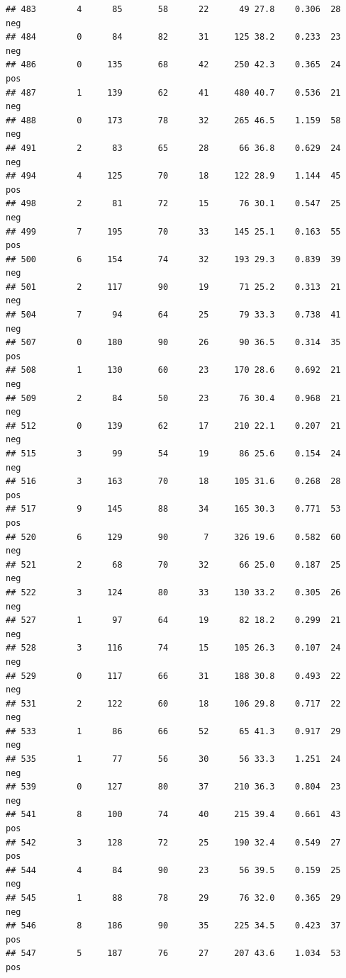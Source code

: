 \documentclass[
]{article}
\begin{document}
\begin{verbatim}
## 483        4      85       58      22      49 27.8    0.306  28      neg
## 484        0      84       82      31     125 38.2    0.233  23      neg
## 486        0     135       68      42     250 42.3    0.365  24      pos
## 487        1     139       62      41     480 40.7    0.536  21      neg
## 488        0     173       78      32     265 46.5    1.159  58      neg
## 491        2      83       65      28      66 36.8    0.629  24      neg
## 494        4     125       70      18     122 28.9    1.144  45      pos
## 498        2      81       72      15      76 30.1    0.547  25      neg
## 499        7     195       70      33     145 25.1    0.163  55      pos
## 500        6     154       74      32     193 29.3    0.839  39      neg
## 501        2     117       90      19      71 25.2    0.313  21      neg
## 504        7      94       64      25      79 33.3    0.738  41      neg
## 507        0     180       90      26      90 36.5    0.314  35      pos
## 508        1     130       60      23     170 28.6    0.692  21      neg
## 509        2      84       50      23      76 30.4    0.968  21      neg
## 512        0     139       62      17     210 22.1    0.207  21      neg
## 515        3      99       54      19      86 25.6    0.154  24      neg
## 516        3     163       70      18     105 31.6    0.268  28      pos
## 517        9     145       88      34     165 30.3    0.771  53      pos
## 520        6     129       90       7     326 19.6    0.582  60      neg
## 521        2      68       70      32      66 25.0    0.187  25      neg
## 522        3     124       80      33     130 33.2    0.305  26      neg
## 527        1      97       64      19      82 18.2    0.299  21      neg
## 528        3     116       74      15     105 26.3    0.107  24      neg
## 529        0     117       66      31     188 30.8    0.493  22      neg
## 531        2     122       60      18     106 29.8    0.717  22      neg
## 533        1      86       66      52      65 41.3    0.917  29      neg
## 535        1      77       56      30      56 33.3    1.251  24      neg
## 539        0     127       80      37     210 36.3    0.804  23      neg
## 541        8     100       74      40     215 39.4    0.661  43      pos
## 542        3     128       72      25     190 32.4    0.549  27      pos
## 544        4      84       90      23      56 39.5    0.159  25      neg
## 545        1      88       78      29      76 32.0    0.365  29      neg
## 546        8     186       90      35     225 34.5    0.423  37      pos
## 547        5     187       76      27     207 43.6    1.034  53      pos

\end{verbatim}
\end{document}
